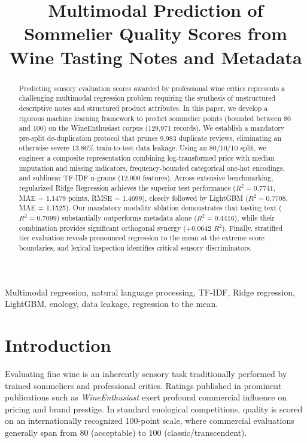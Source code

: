 \documentclass[conference]{IEEEtran}
\begin{document}
\title{Multimodal Prediction of Sommelier Quality Scores from Wine Tasting Notes and Metadata}

\author{
}

\maketitle

\begin{abstract}
Predicting sensory evaluation scores awarded by professional wine critics represents a challenging multimodal regression problem requiring the synthesis of unstructured descriptive notes and structured product attributes. In this paper, we develop a rigorous machine learning framework to predict sommelier points (bounded between 80 and 100) on the WineEnthusiast corpus (129,971 records). We establish a mandatory pre-split de-duplication protocol that prunes 9,983 duplicate reviews, eliminating an otherwise severe 13.86\% train-to-test data leakage. Using an 80/10/10 split, we engineer a composite representation combining log-transformed price with median imputation and missing indicators, frequency-bounded categorical one-hot encodings, and sublinear TF-IDF n-grams (12,000 features). Across extensive benchmarking, regularized Ridge Regression achieves the superior test performance ($R^2 = 0.7741$, MAE = 1.1479 points, RMSE = 1.4699), closely followed by LightGBM ($R^2 = 0.7708$, MAE = 1.1525). Our mandatory modality ablation demonstrates that tasting text ($R^2 = 0.7099$) substantially outperforms metadata alone ($R^2 = 0.4416$), while their combination provides significant orthogonal synergy (+0.0642 $R^2$). Finally, stratified tier evaluation reveals pronounced regression to the mean at the extreme score boundaries, and lexical inspection identifies critical sensory discriminators.
\end{abstract}

\begin{IEEEkeywords}
Multimodal regression, natural language processing, TF-IDF, Ridge regression, LightGBM, enology, data leakage, regression to the mean.
\end{IEEEkeywords}

\section{Introduction}
Evaluating fine wine is an inherently sensory task traditionally performed by trained sommeliers and professional critics. Ratings published in prominent publications such as \textit{WineEnthusiast} exert profound commercial influence on pricing and brand prestige. In standard enological competitions, quality is scored on an internationally recognized 100-point scale, where commercial evaluations generally span from 80 (acceptable) to 100 (classic/transcendent).
\end{document}
